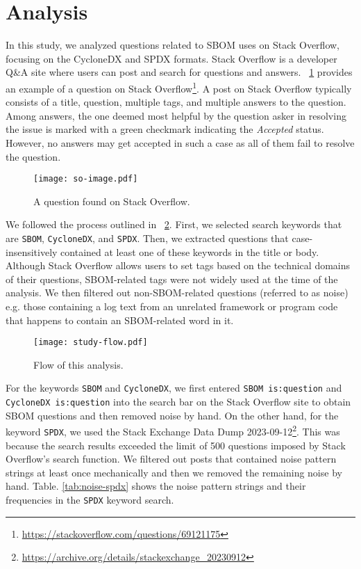 \documentclass[conference]{IEEEtran}
\begin{document}
\section{Analysis}
\label{sec:study}

In this study, we analyzed questions related to SBOM uses on Stack Overflow, focusing on the CycloneDX and SPDX formats. Stack Overflow is a developer Q\&A site where users can post and search for questions and answers. \figurename~\ref{fig:so-image} provides an example of a question on Stack Overflow\footnote{\url{https://stackoverflow.com/questions/69121175}}. A post on Stack Overflow typically consists of a title, question, multiple tags, and multiple answers to the question. Among answers, the one deemed most helpful by the question asker in resolving the issue is marked with a green checkmark indicating the \emph{Accepted} status. However, no answers may get accepted in such a case as all of them fail to resolve the question.

\begin{figure}[!t]
  \begin{minipage}{\linewidth}
    \centering
    \texttt{[image: so-image.pdf]}
    \caption{A question found on Stack Overflow.}
    \label{fig:so-image}
  \end{minipage}
\end{figure}

We followed the process outlined in \figurename~\ref{fig:study-flow}. First, we selected search keywords that are \verb|SBOM|, \verb|CycloneDX|, and \verb|SPDX|. Then, we extracted questions that case-insensitively contained at least one of these keywords in the title or body. Although Stack Overflow allows users to set tags based on the technical domains of their questions, SBOM-related tags were not widely used at the time of the analysis. We then filtered out non-SBOM-related questions (referred to as noise) e.g. those containing a log text from an unrelated framework or program code that happens to contain an SBOM-related word in it.

\begin{figure}[!t]
  \centering
  \texttt{[image: study-flow.pdf]}
  \caption{Flow of this analysis.}
  \label{fig:study-flow}
\end{figure}

For the keywords \verb|SBOM| and \verb|CycloneDX|, we first entered \verb|SBOM is:question| and \verb|CycloneDX is:question| into the search bar on the Stack Overflow site to obtain SBOM questions and then removed noise by hand. On the other hand, for the keyword \verb|SPDX|, we used the Stack Exchange Data Dump 2023-09-12\footnote{\url{https://archive.org/details/stackexchange_20230912}}. This was because the search results exceeded the limit of 500 questions imposed by Stack Overflow's search function. We filtered out posts that contained noise pattern strings at least once mechanically and then we removed the remaining noise by hand. Table. \ref{tab:noise-spdx} shows the noise pattern strings and their frequencies in the \verb|SPDX| keyword search.
\end{document}

